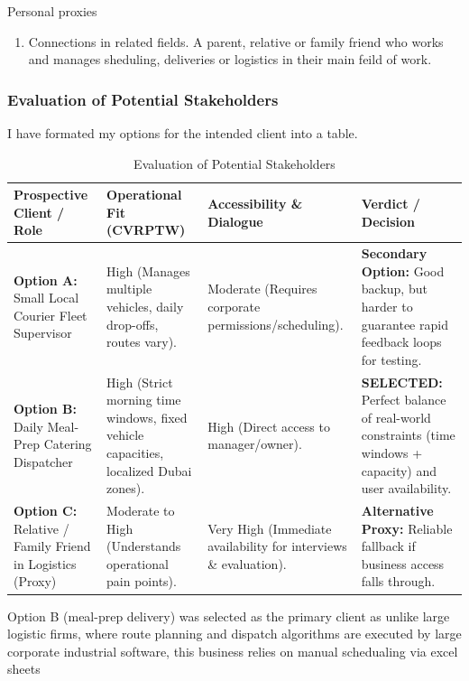 \documentclass[11pt]{article}
\begin{document}
Personal proxies
\begin{enumerate}
  \item Connections in related fields. A parent, relative or family friend who works and manages sheduling, deliveries or logistics in their main feild of work.  
\end{enumerate}

\subsubsection{Evaluation of Potential Stakeholders}
I have formated my options for the intended client into a table. 

\begin{table}[H] %
\centering
\small
\begin{tabular}{@{}L{3.2cm}L{3.8cm}L{3.2cm}L{4.2cm}@{}}
\toprule
\textbf{Prospective Client / Role} & \textbf{Operational Fit (CVRPTW)} & \textbf{Accessibility \& Dialogue} & \textbf{Verdict / Decision} \\ \midrule
\textbf{Option A:} Small Local Courier Fleet Supervisor & High (Manages multiple vehicles, daily drop-offs, routes vary). & Moderate (Requires corporate permissions/scheduling). & \textbf{Secondary Option:} Good backup, but harder to guarantee rapid feedback loops for testing. \\ \midrule
\textbf{Option B:} Daily Meal-Prep Catering Dispatcher & High (Strict morning time windows, fixed vehicle capacities, localized Dubai zones). & High (Direct access to manager/owner). & \textbf{SELECTED:} Perfect balance of real-world constraints (time windows + capacity) and user availability. \\ \midrule
\textbf{Option C:} Relative / Family Friend in Logistics (Proxy) & Moderate to High (Understands operational pain points). & Very High (Immediate availability for interviews \& evaluation). & \textbf{Alternative Proxy:} Reliable fallback if business access falls through. \\ \bottomrule
\end{tabular}
\caption{Evaluation of Potential Stakeholders}
\label{tab:stakeholder_evaluation}
\end{table}

Option B (meal-prep delivery) was selected as the primary client as unlike large logistic firms, where route planning and dispatch algorithms are executed by large corporate industrial software, this business relies on manual schedualing via excel sheets %
\end{document}
